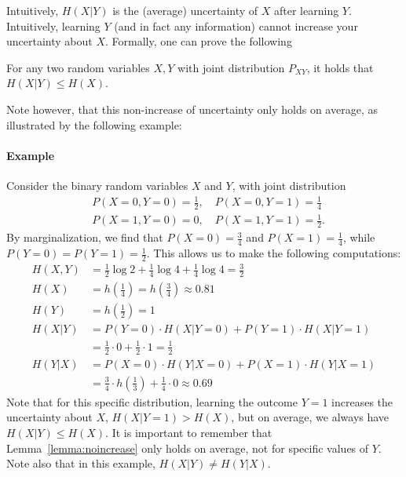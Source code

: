 \documentclass[a4paper,11pt,leqno]{report}\usepackage[]{graphicx}\usepackage[]{color}
\begin{document}
Intuitively, $H(X | Y)$ is the (average) uncertainty of $X$ after learning $Y$. Intuitively, learning $Y$ (and in fact any information) cannot increase your uncertainty about $X$. Formally, one can prove the following 
\begin{Lemma} \label{lemma:noincrease}
For any two random variables $X,Y$ with joint distribution $P_{XY}$, it holds that $H(X | Y) \leq H(X)$.
\end{Lemma}
Note however, that this non-increase of uncertainty only holds on average, as illustrated by the following example:

\paragraph{Example}
Consider the binary random variables $X$ and $Y$, with joint distribution
\begin{align*}
&P(X=0,Y=0) = \frac{1}{2}, \quad P(X=0,Y=1) = \frac{1}{4}\\
&P(X=1,Y=0) = 0, \quad P(X=1,Y=1) = \frac{1}{2}.
\end{align*}
By marginalization, we find that $P(X=0) = \frac{3}{4}$ and $P(X=1) = \frac{1}{4}$, while $P(Y=0) = P(Y=1) = \frac{1}{2}$. This allows us to make the following computations:
\begin{align*}
H(X,Y) &= \frac{1}{2}\log 2 + \frac{1}{4} \log 4  + \frac{1}{4} \log 4 = \frac{3}{2}\\
H(X) &= h\left(\frac{1}{4}\right) = h\left(\frac{3}{4}\right) \approx 0.81\\
H(Y) &= h\left(\frac{1}{2}\right) = 1\\
H(X|Y) &= P(Y=0) \cdot H(X | Y=0) + P(Y=1) \cdot H(X | Y=1)\\
&= \frac{1}{2} \cdot 0 + \frac12 \cdot 1 = \frac12 \\
H(Y|X) &= P(X=0) \cdot H(Y | X=0) + P(X=1) \cdot H(Y | X=1)\\
&= \frac{3}{4} \cdot h\left(\frac{1}{3} \right) + \frac{1}{4} \cdot 0 \approx 0.69
\end{align*}
Note that for this specific distribution, learning the outcome $Y=1$ increases the uncertainty about $X$, $H(X|Y=1) > H(X)$, but on average, we always have $H(X|Y) \leq H(X)$. It is important to remember that Lemma~\ref{lemma:noincrease} only holds on average, not for specific values of $Y$. Note also that in this example, $H(X|Y) \neq H(Y|X)$. 
\end{document}
